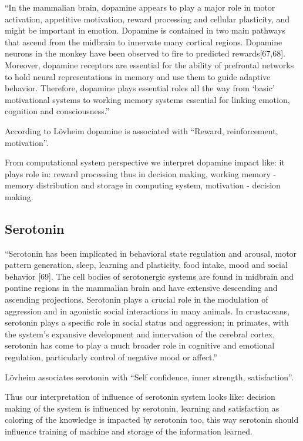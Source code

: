 ``In the mammalian brain, dopamine appears to play a major role in motor activation, appetitive motivation, reward processing and
cellular plasticity, and might be important in emotion. Dopamine is contained in two main pathways that ascend from the midbrain to
innervate many cortical regions. Dopamine neurons in the monkey have been observed to fire to predicted rewards[67,68]. Moreover,
dopamine receptors are essential for the ability of prefrontal networks to hold neural representations in memory and use them
to guide adaptive behavior. Therefore, dopamine plays essential roles all the way from ‘basic’ motivational systems to working
memory systems essential for linking emotion, cognition and consciousness.''

According to L\"{o}vheim \cite{cubeofemotions} dopamine is associated with ``Reward, reinforcement, motivation''.

From computational system perspective we interpret dopamine impact like: it plays role in: reward processing thus in decision making, working memory - memory distribution and storage in computing system, motivation - decision making.

\subsection{Serotonin}

``Serotonin has been implicated in behavioral state regulation and arousal, motor pattern generation, sleep, learning and plasticity, food intake, mood and social behavior [69]. The cell bodies of serotonergic systems are found in midbrain and pontine regions in the mammalian brain and have extensive descending and ascending projections. Serotonin plays a crucial role in the modulation of aggression and in agonistic social interactions in many animals. In crustaceans, serotonin plays a specific role in social status and aggression; in primates, with the system’s expansive development and innervation of the cerebral cortex, serotonin has come to play a much broader role in cognitive and emotional regulation, particularly control of negative mood or affect.''

L\"{o}vheim associates serotonin with ``Self confidence, inner strength, satisfaction''.

Thus our interpretation of influence of serotonin system looks like: decision making of the system is influenced by serotonin, learning and satisfaction as coloring of the knowledge is impacted by serotonin too, this way serotonin should influence training of machine and storage of the information learned.

